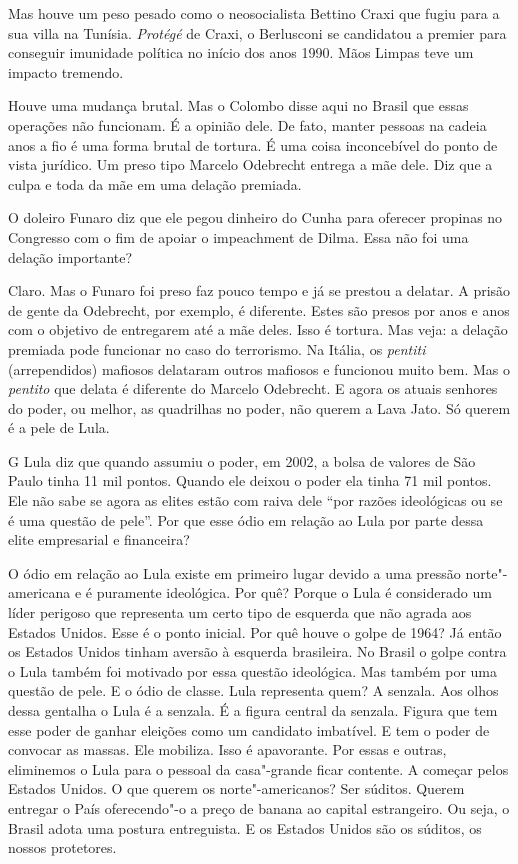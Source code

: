 \falaG Mas houve um peso pesado como o neosocialista Bettino Craxi que fugiu
para a sua villa na Tunísia. \emph{Protégé} de Craxi, o Berlusconi se
candidatou a premier para conseguir imunidade política no início dos
anos 1990. Mãos Limpas teve um impacto tremendo.

\falaM Houve uma mudança brutal. Mas o Colombo disse aqui no Brasil que
essas operações não funcionam. É a opinião dele. De fato, manter pessoas
na cadeia anos a fio é uma forma brutal de tortura. É uma coisa
inconcebível do ponto de vista jurídico. Um preso tipo Marcelo Odebrecht
entrega a mãe dele. Diz que a culpa e toda da mãe em uma delação
premiada.

\falaG O doleiro Funaro diz que ele pegou dinheiro do Cunha para oferecer
propinas no Congresso com o fim de apoiar o impeachment de Dilma. Essa
não foi uma delação importante?

\falaM Claro. Mas o Funaro foi preso faz pouco tempo e já se prestou a
delatar. A prisão de gente da Odebrecht, por exemplo, é diferente. Estes
são presos por anos e anos com o objetivo de entregarem até a mãe deles.
Isso é tortura. Mas veja: a delação premiada pode funcionar no caso do
terrorismo. Na Itália, os \emph{pentiti} (arrependidos) mafiosos
delataram outros mafiosos e funcionou muito bem. Mas o \emph{pentito}
que delata é diferente do Marcelo Odebrecht. E agora os atuais senhores
do poder, ou melhor, as quadrilhas no poder, não querem a Lava Jato. Só
querem é a pele de Lula.

G Lula diz que quando assumiu o poder, em 2002, a bolsa de valores de
São Paulo tinha 11 mil pontos. Quando ele deixou o poder ela tinha 71
mil pontos. Ele não sabe se agora as elites estão com raiva dele ``por
razões ideológicas ou se é uma questão de pele''. Por que esse ódio em
relação ao Lula por parte dessa elite empresarial e financeira?

\falaM O ódio em relação ao Lula existe em primeiro lugar devido a uma
pressão norte"-americana e é puramente ideológica.
Por quê? Porque o Lula é
considerado um líder perigoso que representa um certo tipo de esquerda
que não agrada aos Estados Unidos. Esse é o ponto inicial. Por quê houve
o golpe de 1964? Já então os Estados Unidos tinham aversão à esquerda
brasileira. No Brasil o golpe contra o Lula também foi motivado por essa
questão ideológica. Mas também por uma questão de pele. E o ódio de
classe. Lula representa quem? A senzala. Aos olhos dessa gentalha o Lula
é a senzala. É a figura central da senzala. Figura que tem esse poder de
ganhar eleições como um candidato imbatível. E tem o poder de convocar
as massas. Ele mobiliza. Isso é apavorante. Por essas e outras,
eliminemos o Lula para o pessoal da casa"-grande ficar contente. A
começar pelos Estados Unidos. O que querem os norte"-americanos? Ser
súditos. Querem entregar o País oferecendo"-o a preço de banana ao
capital estrangeiro. Ou seja, o Brasil adota uma postura entreguista. E
os Estados Unidos são os súditos, os nossos protetores.

